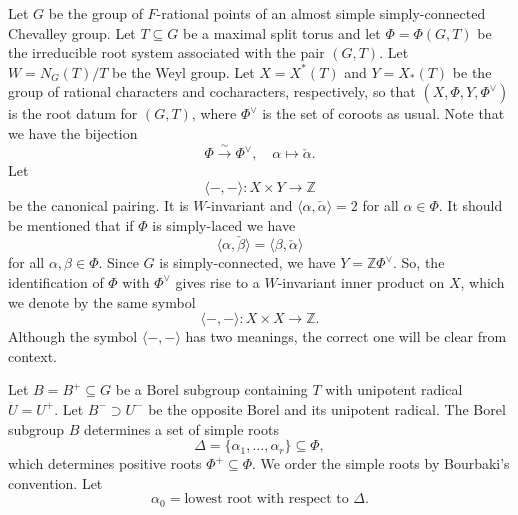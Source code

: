 \documentclass[10pt, letterpaper]{amsart}
\theoremstyle{plain}
\theoremstyle{definition}
\numberwithin{equation}{section}
\newcommand{\Z}{\mathbb{Z}}
\newcommand{\alphac}{{\check{\alpha}}}
\newcommand{\betac}{{\check{\beta}}}
\newcommand{\Ocal}{\mathcal{O}}
\newcommand{\la}{\langle}
\newcommand{\ra}{\rangle}
\begin{document}
Let $G$ be the group of $F$-rational points of an almost simple simply-connected Chevalley group. Let $T\subseteq G$ be a maximal split torus and let $\Phi=\Phi(G,T)$ be the irreducible root system associated with the pair $(G,T)$. Let $W=N_G(T)\slash T$ be the Weyl group. Let $X=X^*(T)$ and $Y=X_*(T)$ be the group of rational characters and cocharacters, respectively, so that $(X, \Phi, Y, \Phi^\vee)$ is the root datum for $(G, T)$, where $\Phi^\vee$ is the set of coroots as usual. Note that we have the bijection
\[
\Phi\xrightarrow{\;\sim\;}\Phi^\vee,\quad \alpha\mapsto \alphac.
\]
Let
\[
\la-,-\ra:X\times Y\longrightarrow\Z
\]
be the canonical pairing. It is $W$-invariant and $\la\alpha, \alphac\ra=2$ for all $\alpha\in\Phi$. It should be mentioned that if $\Phi$ is simply-laced we have
\[
\la \alpha, \betac\ra=\la \beta, \alphac\ra
\]
for all $\alpha, \beta\in\Phi$. Since $G$ is simply-connected, we have $Y=\Z\Phi^{\vee}$. So, the identification of $\Phi$ with $\Phi^\vee$ gives rise to a $W$-invariant inner product on $X$, which we denote by the same symbol
\[
\la-,-\ra:X\times X\longrightarrow\Z.
\]
Although the symbol $\la-,-\ra$ has two meanings, the correct one will be clear from context.



Let $B=B^{+}\subseteq G$ be a Borel subgroup containing $T$ with unipotent radical $U=U^{+}$. Let $B^{-}\supset U^{-}$ be the opposite Borel and its unipotent radical. The Borel subgroup $B$ determines a set of simple roots
\[
\Delta=\{\alpha_1,\dots,\alpha_r\}\subseteq \Phi,
\]
which determines positive roots $\Phi^+\subseteq\Phi$. We order the simple roots by Bourbaki's convention. Let
\[
\alpha_0=\text{lowest root with respect to $\Delta$}.
\]

\end{document}
